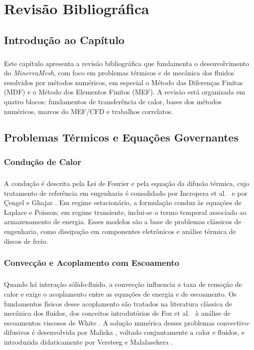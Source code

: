 \chapter{Revisão Bibliográfica}
\label{cap2}

\section{Introdução ao Capítulo}
\label{sec:revbiblio_intro}

\paragraph{}Este capítulo apresenta a revisão bibliográfica que fundamenta o desenvolvimento do \textit{MinervaMesh}, com foco em problemas térmicos e de mecânica dos fluidos resolvidos por métodos numéricos, em especial o Método das Diferenças Finitas (MDF) e o Método dos Elementos Finitos (MEF). A revisão está organizada em quatro blocos: fundamentos de transferência de calor, bases dos métodos numéricos, marcos do MEF/CFD e trabalhos correlatos.

\section{Problemas Térmicos e Equações Governantes}

\subsection{Condução de Calor}
\paragraph{}A condução é descrita pela Lei de Fourier e pela equação da difusão térmica, cujo tratamento de referência em engenharia é consolidado por Incropera et al.\ \cite{Incropera2006} e por Çengel e Ghajar \cite{Cengel2015}. Em regime estacionário, a formulação conduz às equações de Laplace e Poisson; em regime transiente, inclui-se o termo temporal associado ao armazenamento de energia. Esses modelos são a base de problemas clássicos de engenharia, como dissipação em componentes eletrônicos e análise térmica de discos de freio.

\subsection{Convecção e Acoplamento com Escoamento}
\paragraph{}Quando há interação sólido-fluido, a convecção influencia a taxa de remoção de calor e exige o acoplamento entre as equações de energia e de escoamento. Os fundamentos físicos desse acoplamento são tratados na literatura clássica de mecânica dos fluidos, dos conceitos introdutórios de Fox et al.\ \cite{Fox2012} à análise de escoamentos viscosos de White \cite{White2006}. A solução numérica desses problemas convectivo-difusivos é desenvolvida por Maliska \cite{Maliska2004}, voltado conjuntamente a calor e fluidos, e introduzida didaticamente por Versteeg e Malalasekera \cite{Versteeg2007}.

